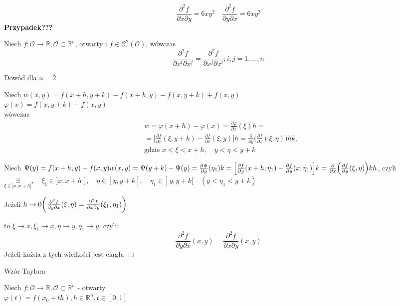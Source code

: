 \documentclass[../main.tex]{subfiles}
\begin{document}
$$\frac{\partial^2 f}{\partial x \partial y} = 6xy^2 \quad \frac{\partial^2 f}{\partial y \partial x} = 6xy^2$$
\textbf{Przypadek???}

\begin{tw}
Niech $f: \mathcal{O}\to\mathbb{R}, \mathcal{O}\subset \mathbb{R}^n$, otwarty i $f\in\mathcal{C}^2(\mathcal{O})$, wówczas
$$\frac{\partial^2 f}{\partial x^i \partial x^j} = \frac{\partial^2 f}{\partial x^j \partial x^i}; i,j=1,\dots,n$$
\end{tw}

\begin{dowod}
    Dowód dla $n=2$
\end{dowod}
Niech $w(x,y) = f(x+h,y+k) - f(x+h,y) - f(x,y+k) + f(x,y)$\\
$\varphi(x) = f(x,y+k) - f(x,y)$\\
wówczas
\begin{align*}
    &w=\varphi(x+h) - \varphi(x) = \frac{\partial \varphi}{\partial x} (\xi)h = \\
&=\Big [ \frac{\partial f}{\partial x} (\xi, y+k) - \frac{\partial f}{\partial x} (\xi, y) \Big ]h = \frac{\partial }{\partial y} \Big ( \frac{\partial f}{\partial x} (\xi,\eta) \Big ) hk
,\\
    & \text{gdzie }x<\xi<x+h,\quad y<\eta<y+k
\end{align*}

Niech $\Psi(y)=f(x+h,y)-f(x,y)\\
w(x,y) = \Psi(y+k) - \Psi(y) = \frac{\partial \Psi}{\partial y} (\eta_1)k = \Big [\frac{\partial f}{\partial y} (x+h,\eta_1) - \frac{\partial f}{\partial y} (x,\eta_1) \Big ] k = \frac{\partial }{\partial x} \Big ( \frac{\partial f}{\partial y} (\xi,\eta) \Big ) kh$, czyli $\underset{\xi\in]x,x+h[}{\exists},\quad \xi_1\in]x,x+h[,\quad \eta\in]y,y+k[,\quad \eta_1\in]y,y+k[ \quad (y<\eta_1<y+k)$

Jeżeli $h\to 0\\
\bigg ( \frac{\partial^2 f}{\partial y \partial x} (\xi,\eta) = \frac{\partial^2 f}{\partial x \partial y} (\xi_1,\eta_1) \bigg )$

to $\xi \to x, \xi_1 \to x, \eta \to y, \eta_1 \to y$, czyli:
$$\frac{\partial^2 f}{\partial y \partial x} (x,y) = \frac{\partial^2 f}{\partial x \partial y} (x,y) $$
Jeżeli każda z tych wielkości jest ciągła $\Box$

\begin{large}
    Wzór Taylora
\end{large}
Niech $f: \mathcal{O}\to\mathbb{R}, \mathcal{O}\subset \mathbb{R}^n$ - otwarty\\
$\varphi(t) = f(x_0+th), h\in \mathbb{R}^n, t\in[0,1]$
\end{document}
